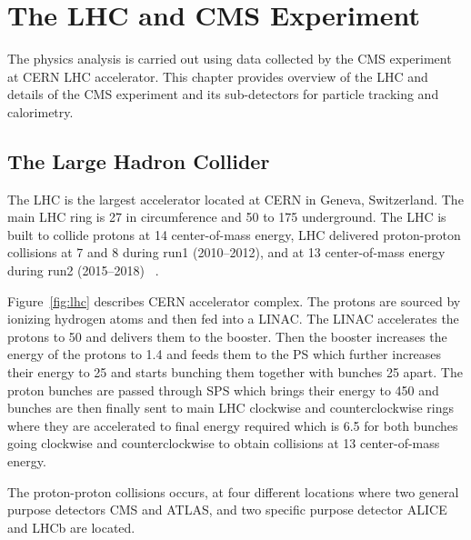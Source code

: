 \chapter{
  The LHC and CMS Experiment
 }\label{ch_cms}

The physics analysis is carried out using data collected by the \gls{CMS} experiment at
\gls{CERN} \gls{LHC} accelerator. This chapter provides overview of the \gls{LHC}
and details of the CMS experiment and its sub-detectors for particle tracking
and calorimetry.

\section{
  The Large Hadron Collider
 }\label{ch_cms:lhc}

The \gls{LHC} is the largest accelerator located at
\gls{CERN} in Geneva, Switzerland.
The main \gls{LHC} ring is 27\km{} in circumference
and 50 to 175\m{} underground.
The \gls{LHC} is built to collide protons at 14\TeV{} center-of-mass energy,
LHC delivered proton-proton collisions at 7 and 8\TeV{}
during run1 (2010--2012), and at 13\TeV{} center-of-mass energy during
run2 (2015--2018)
~\cite{Evans:2008}.

Figure~\ref{fig:lhc} describes \gls{CERN} accelerator complex.
The protons are sourced by ionizing hydrogen atoms
and then fed into a \gls{LINAC}.
The \gls{LINAC} accelerates the protons to 50\MeV{} and delivers them to the booster.
Then the booster increases the energy of the protons to 1.4\GeV{} and
feeds them to the \gls{PS} which further increases their energy to 25\GeV{}
and starts bunching them together with bunches 25\nanoseconds{} apart.
The proton bunches are passed through \gls{SPS} which brings their energy
to 450\GeV{} and bunches are then finally sent to main \gls{LHC} clockwise and counterclockwise
rings where they are accelerated to final energy required which is 6.5\TeV{}
for both bunches going clockwise and counterclockwise
to obtain collisions at 13\TeV{} center-of-mass energy.

The proton-proton collisions occurs, at four different locations where two
general purpose detectors \gls{CMS} and \gls{ATLAS}, and
two specific purpose detector \gls{ALICE} and \gls{LHCb} are located.

